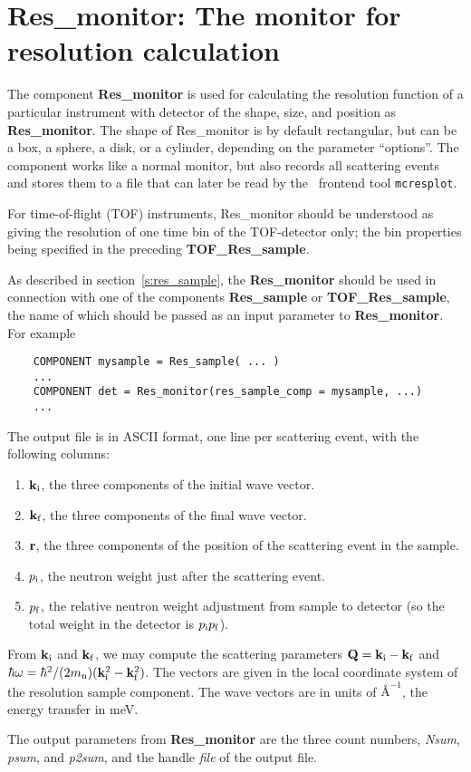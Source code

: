 \section{Res\_monitor: The monitor for resolution calculation}
\label{s:res_monitor}


The component {\bf Res\_monitor} is used for calculating the
resolution function of a particular instrument with detector of the
shape, size, and position as {\bf Res\_monitor}.
The shape of {\rm Res\_monitor} is by default rectangular,
but can be a box, a sphere, a disk, or a cylinder,
depending on the parameter ``options''.
The component works like a normal monitor, but
also records all scattering events and stores
them to a file that can later be read by 
the \MCS\ frontend tool \verb+mcresplot+.

For time-of-flight (TOF) instruments, {Res\_monitor} should be understood 
as giving the resolution of one time bin of the TOF-detector only; 
the bin properties being specified in the preceding {\bf TOF\_Res\_sample}.

As described in section~\ref{s:res_sample},
the {\bf Res\_monitor} should be used in connection with one of the
components {\bf Res\_sample} or {\bf TOF\_Res\_sample}, 
the name of which should be passed as an
input parameter to \textbf{Res\_monitor}. For example
\begin{verbatim}
    COMPONENT mysample = Res_sample( ... )
    ...
    COMPONENT det = Res_monitor(res_sample_comp = mysample, ...)
    ...
\end{verbatim}

The output file is in ASCII format, one line per scattering event, with
the following columns:
\begin{enumerate}
\item ${\bf k}_{\rm i}$, the three components of the initial wave vector.
\item ${\bf k}_{\rm f}$, the three components of the final wave vector.
\item ${\bf r}$, the three components of the position of the scattering
  event in the sample.
\item $p_{\rm i}$, the neutron weight just after the scattering event.
\item $p_{\rm f}$, the relative neutron weight adjustment from sample to
  detector (so the total weight in the detector is $p_{\rm i}p_{\rm f}$).
\end{enumerate}
From ${\bf k}_{\rm i}$ and ${\bf k}_{\rm f}$, we may compute 
the scattering parameters 
${\bf Q} = {\bf k}_{\rm i} - {\bf k}_{\rm f}$ and 
$\hbar \omega = \hbar^2/(2 m_{\rm n})({\bf k}_{\rm i}^2 - {\bf k}_{\rm f}^2)$.
The vectors are given in the local coordinate system of the resolution
sample component. The wave vectors are in units of $\mbox{\AA}^{-1}$, the
energy transfer in meV.

The output parameters from {\bf Res\_monitor}
are the three count numbers, \textit{Nsum}, \textit{psum},
and \textit{p2sum}, and the handle \textit{file} of the output file.
